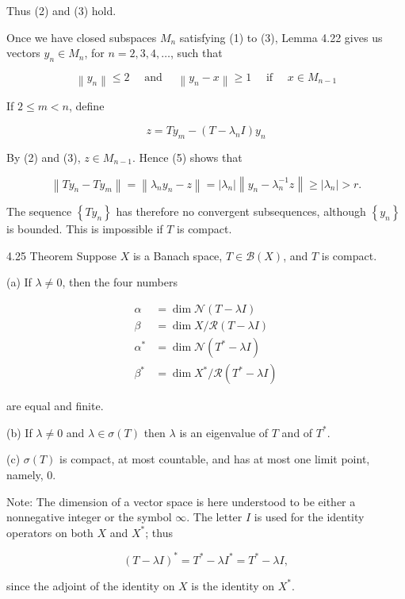 \documentclass[10pt]{article}
\begin{document}
Thus (2) and (3) hold.

Once we have closed subspaces $M_{n}$ satisfying (1) to (3), Lemma 4.22 gives us vectors $y_{n} \in M_{n}$, for $n=2,3,4, \ldots$, such that

$$
\left\|y_{n}\right\| \leq 2 \quad \text { and } \quad\left\|y_{n}-x\right\| \geq 1 \quad \text { if } \quad x \in M_{n-1}
$$

If $2 \leq m<n$, define

$$
z=T y_{m}-\left(T-\lambda_{n} I\right) y_{n}
$$

By (2) and (3), $z \in M_{n-1}$. Hence (5) shows that

$$
\left\|T y_{\dot{n}}-T y_{m}\right\|=\left\|\lambda_{n} y_{n}-z\right\|=\left|\lambda_{n}\right|\left\|y_{n}-\lambda_{n}^{-1} z\right\| \geq\left|\lambda_{n}\right|>r .
$$

The sequence $\left\{T y_{n}\right\}$ has therefore no convergent subsequences, although $\left\{y_{n}\right\}$ is bounded. This is impossible if $T$ is compact.

4.25 Theorem Suppose $X$ is a Banach space, $T \in \mathscr{B}(X)$, and $T$ is compact.

(a) If $\lambda \neq 0$, then the four numbers

$$
\begin{aligned}
\alpha & =\operatorname{dim} \mathscr{N}(T-\lambda I) \\
\beta & =\operatorname{dim} X / \mathscr{R}(T-\lambda I) \\
\alpha^{*} & =\operatorname{dim} \mathscr{N}\left(T^{*}-\lambda I\right) \\
\beta^{*} & =\operatorname{dim} X^{*} / \mathscr{R}\left(T^{*}-\lambda I\right)
\end{aligned}
$$

are equal and finite.

(b) If $\lambda \neq 0$ and $\lambda \in \sigma(T)$ then $\lambda$ is an eigenvalue of $T$ and of $T^{*}$.

(c) $\sigma(T)$ is compact, at most countable, and has at most one limit point, namely, 0.

Note: The dimension of a vector space is here understood to be either a nonnegative integer or the symbol $\infty$. The letter $I$ is used for the identity operators on both $X$ and $X^{*}$; thus

$$
(T-\lambda I)^{*}=T^{*}-\lambda I^{*}=T^{*}-\lambda I,
$$

since the adjoint of the identity on $X$ is the identity on $X^{*}$.
\end{document}
